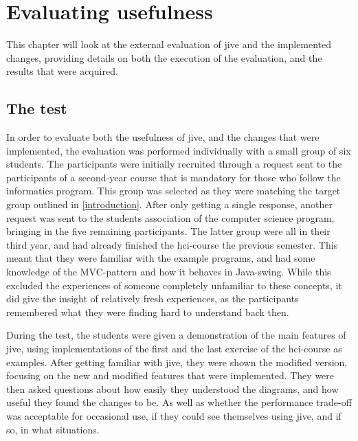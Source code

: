 \chapter{Evaluating usefulness}\label{jiveEval}

This chapter will look at the external evaluation of \gls{jive} and the implemented changes, providing details on both the execution of the evaluation, and the results that were acquired.

\section{The test}\label{jiveEvalTest}
In order to evaluate both the usefulness of \gls{jive}, and the changes that were implemented, the evaluation was performed individually with a small group of six students.
The participants were initially recruited through a request sent to the participants of a second-year course that is mandatory for those who follow the informatics program.
This group was selected as they were matching the target group outlined in \cref{introduction}.
After only getting a single response, another request was sent to the students association of the computer science program, bringing in the five remaining participants.
The latter group were all in their third year, and had already finished the \gls{hci}-course the previous semester.
This meant that they were familiar with the example programs, and had some knowledge of the MVC-pattern and how it behaves in Java-swing.
While this excluded the experiences of someone completely unfamiliar to these concepts, it did give the insight of relatively fresh experiences, as the participants remembered what they were finding hard to understand back then.

During the test, the students were given a demonstration of the main features of \gls{jive}, using implementations of the first and the last exercise of the \gls{hci}-course as examples.
After getting familiar with \gls{jive}, they were shown the modified version, focusing on the new and modified features that were implemented.
They were then asked questions about how easily they understood the diagrams, and how useful they found the changes to be.
As well as whether the performance trade-off was acceptable for occasional use, if they could see themselves using \gls{jive}, and if so, in what situations.


